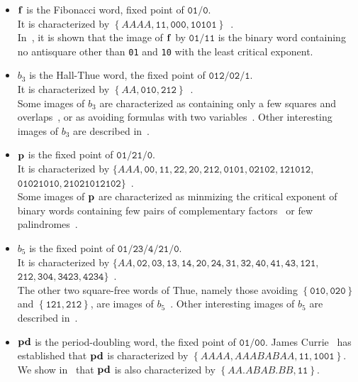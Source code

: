\documentclass{article}
\def\acc#1{\left\{ #1 \right\}}
\theoremstyle{plain}
\theoremstyle{definition}
\theoremstyle{remark}
\begin{document}
\begin{itemize}
\item ${\bf f}$ is the Fibonacci word, fixed point of $\texttt{01}/\texttt{0}$.\\
It is characterized by $\acc{AAAA,\texttt{11},\texttt{000},\texttt{10101}}$~\cite{BCMORS2023}.\\
In~\cite{BCMORS2023}, it is shown that the image of ${\bf f}$ by $\texttt{01}/\texttt{11}$
is the binary word containing no antisquare other than \texttt{01} and \texttt{10} with the least
critical exponent.
\item $b_3$ is the Hall-Thue word, the fixed point of $\texttt{012}/\texttt{02}/\texttt{1}$.\\
It is characterized by $\acc{AA,\texttt{010},\texttt{212}}$~\cite{Thue06,Thue:1912}.\\
Some images of $b_3$ are characterized as containing only a few squares and overlaps~\cite{BO15},
or as avoiding formulas with two variables~\cite{OchemRosenfeld2016}.
Other interesting images of $b_3$ are described in~.
\item ${\bf p}$ is the fixed point of $\texttt{01}/\texttt{21}/\texttt{0}$.\\
It is characterized by $\{AAA,\texttt{00},\texttt{11},\texttt{22},\texttt{20},\texttt{212},\texttt{0101},\texttt{02102},\texttt{121012},$\\
$\texttt{01021010},\texttt{21021012102}\}$~\cite{CORS2022}.\\
Some images of ${\bf p}$ are characterized as minmizing the critical exponent of binary words containing few pairs
of complementary factors~\cite{CDOORS2023} or few palindromes~\cite{DOO2023}.
\item $b_5$ is the fixed point of $\texttt{01}/\texttt{23}/\texttt{4}/\texttt{21}/\texttt{0}$.\\
It is characterized by $\{AA,\texttt{02},\texttt{03},\texttt{13},\texttt{14},\texttt{20},\texttt{24},\texttt{31},\texttt{32},\texttt{40},\texttt{41},\texttt{43},\texttt{121},$\\
$\texttt{212},\texttt{304},\texttt{3423},\texttt{4234}\}$~\cite{BO15}.\\
The other two square-free words of Thue, namely those avoiding $\acc{\texttt{010},\texttt{020}}$ and $\acc{\texttt{121},\texttt{212}}$,
are images of $b_5$~\cite{BO15}. Other interesting images of $b_5$ are described in~.
\item ${\bf pd}$ is the period-doubling word, the fixed point of $\texttt{01}/\texttt{00}$.
James Currie~\cite{Currie2023} has established that ${\bf pd}$ is characterized by $\acc{AAAA, AAABABAA,\texttt{11},\texttt{1001}}$.
We show in~ that ${\bf pd}$ is also characterized by $\acc{AA.ABAB.BB,\texttt{11}}$.\\
\end{itemize}
\end{document}
